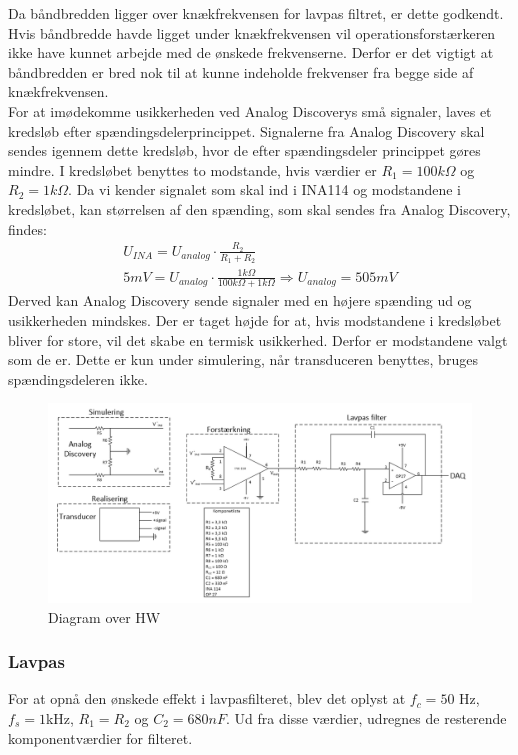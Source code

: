 Da båndbredden ligger over knækfrekvensen for lavpas filtret, er dette godkendt. Hvis båndbredde havde ligget under knækfrekvensen vil operationsforstærkeren ikke have kunnet arbejde med de ønskede frekvenserne. Derfor er det vigtigt at båndbredden er bred nok til at kunne indeholde frekvenser fra begge side af knækfrekvensen.\\
\newline 
For at imødekomme usikkerheden ved Analog Discoverys små signaler, laves et kredsløb efter spændingsdelerprincippet. Signalerne fra Analog Discovery skal sendes igennem dette kredsløb, hvor de efter spændingsdeler princippet gøres mindre. I kredsløbet benyttes to modstande, hvis værdier er $ R_1=100k\Omega $ og $ R_2 = 1k\Omega $. Da vi kender signalet som skal ind i INA114 og modstandene i kredsløbet, kan størrelsen af den spænding, som skal sendes fra Analog Discovery, findes:
\begin{equation}
\begin{split}
U_{INA} = U_{analog} \cdot \frac{R_2}{R_1 + R_2} \\
5mV = U_{analog}\cdot \frac{1k\Omega}{100k\Omega+1k\Omega} \Rightarrow U_{analog}= 505mV
\end{split}
\end{equation} 
Derved kan Analog Discovery sende signaler med en højere spænding ud og usikkerheden mindskes. Der er taget højde for at, hvis modstandene i kredsløbet bliver for store, vil det skabe en termisk usikkerhed. Derfor er modstandene valgt som de er. Dette er kun under simulering, når transduceren benyttes, bruges spændingsdeleren ikke.  
\begin{figure}[H]
	\centering
	\includegraphics[width=1.0\textwidth]{Figurer/diagram_over_HW}
	\caption{Diagram over HW}
	\label{fig:HW}
\end{figure}

\subsubsection{Lavpas}
For at opnå den ønskede effekt i lavpasfilteret, blev det oplyst at $ f_c=50$ Hz, $ f_s = 1$kHz, $ R_1 = R_2 $ og $ C_2=680 nF$. Ud fra disse værdier, udregnes de resterende komponentværdier for filteret.

